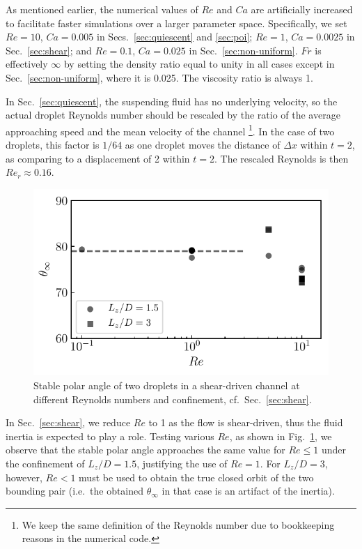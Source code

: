As mentioned earlier, the numerical values of $Re$ and $Ca$ are artificially increased to facilitate faster simulations over a larger parameter space. Specifically, we set $Re=10$, $Ca=0.005$ in Secs.\ \ref{sec:quiescent} and \ref{sec:poi}; $Re=1$, $Ca=0.0025$ in Sec.\ \ref{sec:shear}; and $Re=0.1$, $Ca=0.025$ in Sec.\ \ref{sec:non-uniform}. $Fr$ is effectively $\infty$ by setting the density ratio equal to unity in all cases except in Sec.\ \ref{sec:non-uniform}, where it is 0.025. The viscosity ratio is always 1. 

In Sec.\ \ref{sec:quiescent}, the suspending fluid has no underlying velocity, so the actual droplet Reynolds number should be rescaled by the ratio of the average approaching speed and the mean velocity of the channel \footnote{We keep the same definition of the Reynolds number due to bookkeeping reasons in the numerical code.}. In the case of two droplets, this factor is $1/64$ as one droplet moves the distance of $\Delta x$ within $t=2$, as comparing to a displacement of 2 within $t=2$. The rescaled Reynolds is then $Re_r \approx 0.16$.

\begin{figure}[t]
 \centering
 \includegraphics[width=.75\columnwidth]{figs/steady_angle1.pdf}
 \caption{Stable polar angle of two droplets in a shear-driven channel at different Reynolds numbers and confinement, cf.\ Sec.\ \ref{sec:shear}. }
 \label{fig: verify Re}
\end{figure}

In Sec.\ \ref{sec:shear}, we reduce $Re$ to 1 as the flow is shear-driven, thus the fluid inertia is expected to play a role. Testing various $Re$, as shown in Fig.\ \ref{fig: verify Re}, we observe that the stable polar angle approaches the same value for $Re \leqslant 1$ under the confinement of $L_z/D =1.5$, justifying the use of $Re=1$. For $L_z/D =3$, however, $Re<1$ must be used to obtain the true closed orbit of the two bounding pair (i.e.\ the obtained $\theta_\infty$ in that case is an artifact of the inertia).

